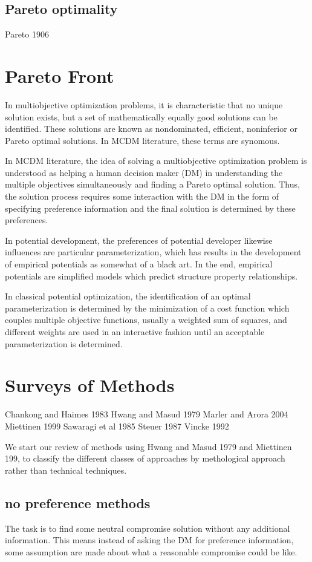 \subsection{Pareto optimality}

Pareto 1906


\section{Pareto Front}

In multiobjective optimization problems, it is characteristic that no unique solution exists, but a set of mathematically equally good solutions can be identified.  These solutions are known as nondominated, efficient, noninferior or Pareto optimal solutions.  In MCDM literature, these terms are synomous.

In MCDM literature, the idea of solving a multiobjective optimization problem is understood as helping a human decision maker (DM) in understanding the multiple objectives simultaneously and finding a Pareto optimal solution.  Thus, the solution process requires some interaction with the DM in the form of specifying preference information and the final solution is determined by these preferences.

In potential development, the preferences of potential developer likewise influences are particular parameterization, which has results in the development of empirical potentials as somewhat of a black art.  In the end, empirical potentials are simplified models which predict structure property relationships.

In classical potential optimization, the identification of an optimal parameterization is determined by the minimization of a cost function which couples multiple objective functions, usually a weighted sum of squares, and different weights are used in an interactive fashion until an acceptable parameterization is determined.
\section{Surveys of Methods}
Chankong and Haimes 1983
Hwang and Masud 1979
Marler and Arora 2004
Miettinen 1999
Sawaragi et al 1985
Steuer 1987
Vincke 1992

We start our review of methods using Hwang and Masud 1979 and Miettinen 199, to classify the different classes of approaches by methological approach rather than technical techniques.
\subsection{no preference methods}
The task is to find some neutral compromise solution without any additional information.  This means instead of asking the DM for preference information, some assumption are made about what a reasonable compromise could be like.
